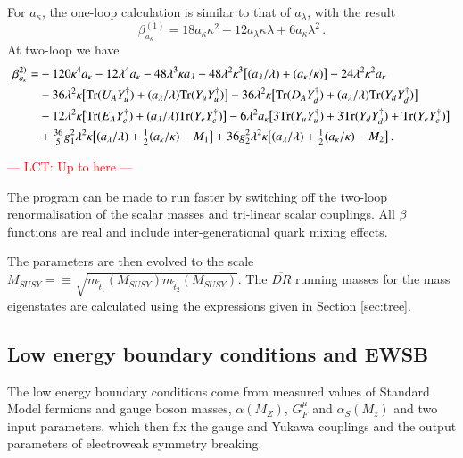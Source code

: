 \documentclass[final,3p,times,pdflatex]{elsarticle}
\newcommand{\lamsq}{\lambda^2}
\newcommand{\kapsq}{\kappa^2}
\newcommand{\tr}{\mathrm{Tr}}
\newcommand{\Alam}{a_\lambda/\lambda}
\newcommand{\Akap}{a_\kappa/\kappa}
\begin{document}
For $a_\kappa$, the one-loop calculation is similar to that of $a_\lambda$, with 
the result
%
\begin{equation}
\beta_{a_\kappa}^{(1)} = 18a_\kappa\kappa^2 + 12a_\lambda\kappa\lambda 
+ 6a_\kappa\lamsq\,.
\end{equation}
%
At two-loop we have
%
\begin{align}
\beta_{a_\kappa}^{2)} =& -120\kappa^4 a_\kappa - 12\lambda^4 a_\kappa 
- 48\lambda^3\kappa a_\lambda - 48\lamsq\kappa^3\big[ (\Alam) + (\Akap)\big]
-24\lamsq\kapsq a_\kappa \notag \\
%
&-36\lamsq\kappa\big[ \tr( U_A Y_u^\dagger) + (\Alam)\tr( Y_u Y_u^\dagger)\big]
-36\lamsq\kappa\big[ \tr( D_A Y_d^\dagger) + (\Alam)\tr( Y_d Y_d^\dagger)\big] 
\notag \\
%
&-12\lamsq\kappa\big[ \tr( E_A Y_e^\dagger) + (\Alam)\tr( Y_e Y_e^\dagger)\big]
-6\lamsq a_\kappa\big[ 3\tr( Y_u Y_u^\dagger) + 3\tr( Y_d Y_d^\dagger) 
+ \tr( Y_e Y_e^\dagger) \big] \notag \\
%
&+ \tfrac{36}{5}g_1^2\lamsq\kappa\big[ (\Alam) + \tfrac{1}{2}(\Akap) - M_1\big] 
+ 36g_2^2\lamsq \kappa\big[ (\Alam) + \tfrac{1}{2}(\Akap) - M_2 \big]\,.
\end{align}

\textcolor{red}{--- LCT: Up to here ---}

The program 
can be made to run faster by switching off the two-loop renormalisation of 
the scalar masses and tri-linear scalar couplings. All
$\beta$ functions are real and include inter-generational quark mixing
effects. 


The parameters are then evolved to the scale $M_{SUSY}= \equiv
\sqrt{m_{{\tilde t}_1}(M_{SUSY}) m_{{\tilde t}_2}(M_{SUSY})}$.  The
$\overline{DR}$ running masses for the mass eigenstates are calculated
using the expressions given in Section \ref{sec:tree}.
\subsection{Low energy boundary conditions and EWSB \label{ewsb}}
The low energy boundary conditions come from measured values of
Standard Model fermions and gauge boson masses, $\alpha(M_Z)$,
$G_F^\mu$ and $\alpha_S(M_z)$ and two input parameters, which then fix
the gauge and Yukawa couplings and the output parameters of
electroweak symmetry breaking.
 
\end{document}
